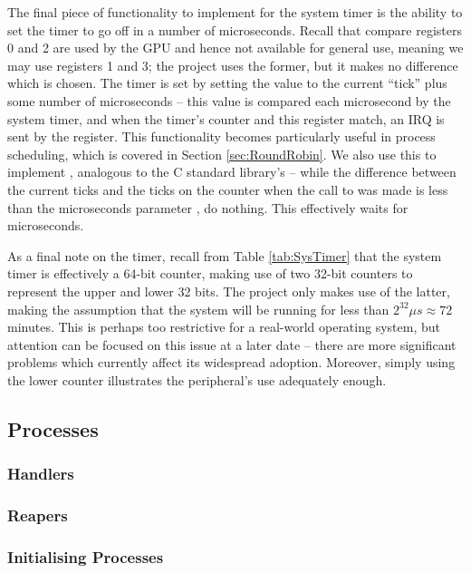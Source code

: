     The final piece of functionality to implement for the system timer is the
    ability to set the timer to go off in a number of microseconds. Recall that
    compare registers 0 and 2 are used by the GPU and hence not available for
    general use, meaning we may use registers 1 and 3; the project uses the
    former, but it makes no difference which is chosen. The timer is set by
    setting the  value to the current ``tick'' plus some number
    of microseconds -- this value is compared each microsecond by the system
    timer, and when the timer's counter and this register match, an IRQ is sent
    by the  register. This functionality becomes particularly
    useful in process scheduling, which is covered in Section
    \ref{sec:RoundRobin}. We also use this to implement ,
    analogous to the C standard library's  -- while the
    difference between the current ticks and the ticks on the counter when the
    call to  was made is less than the microseconds parameter
    , do nothing. This effectively waits for 
    microseconds.

    As a final note on the timer, recall from Table \ref{tab:SysTimer} that the
    system timer is effectively a 64-bit counter, making use of two 32-bit
    counters to represent the upper and lower 32 bits. The project only makes
    use of the latter, making the assumption that the system will be running for
    less than $2^{32} \mu s \approx 72$ minutes. This is perhaps too restrictive
    for a real-world operating system, but attention can be focused on this
    issue at a later date -- there are more significant problems which currently
    affect its widespread adoption. Moreover, simply using the lower counter
    illustrates the peripheral's use adequately enough.

\subsection{Processes}
    \subsubsection{Handlers}
    \subsubsection{Reapers}
        \label{sec:cleanup}
    \subsubsection{Initialising Processes}
